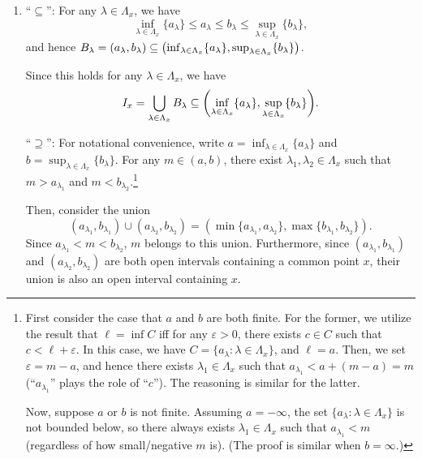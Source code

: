 \begin{enumerate}
\begin{pf}
\begin{enumerate}
\item ``\(\subseteq\)'': For any \(\lambda\in\Lambda_{x}\), we have
\[
\inf_{\lambda\in\Lambda_{x}}\{a_{\lambda}\}
\le a_{\lambda}\le b_{\lambda}
\le\sup_{\lambda\in\Lambda_{x}}\{b_{\lambda}\},
\]
and hence \(B_{\lambda}=(a_{\lambda},b_{\lambda})\subseteq
\qty(\inf_{\lambda\in\Lambda_{x}}\{a_{\lambda}\}
,\sup_{\lambda\in\Lambda_x}\{b_{\lambda}\})\).

Since this holds for any \(\lambda\in\Lambda_{x}\), we have
\[
I_x=\bigcup_{\lambda\in\Lambda_{x}}B_{\lambda}
\subseteq \qty(\inf_{\lambda\in\Lambda_{x}}\{a_{\lambda}\}
,\sup_{\lambda\in\Lambda_x}\{b_{\lambda}\}).
\]

``\(\supseteq\)'': For notational convenience, write \(\displaystyle
a=\inf_{\lambda\in\Lambda_{x}}\{a_{\lambda}\}\) and \(\displaystyle
b=\sup_{\lambda\in\Lambda_{x}}\{b_{\lambda}\}\). For any \(m\in(a,b)\), there
exist \(\lambda_1,\lambda_2\in\Lambda_{x}\) such that \(m>a_{\lambda_1}\) and
\(m<b_{\lambda_2}\).\footnote{First consider the case that \(a\) and \(b\)
are both finite. For the former, we utilize the result that \(\ell=\inf C\) iff
for any \(\varepsilon>0\), there exists \(c\in C\) such that
\(c<\ell+\varepsilon\). In this case, we have
\(C=\{a_{\lambda}:\lambda\in\Lambda_{x}\}\), and \(\ell=a\). Then, we set
\(\varepsilon=m-a\), and hence there exists \(\lambda_{1}\in\Lambda_{x}\) such
that \(a_{\lambda_1}<a+(m-a)=m\) (``\(a_{\lambda_1}\)'' plays the role of
``\(c\)''). The reasoning is similar for the latter.

Now, suppose \(a\) or \(b\) is not finite. Assuming \(a=-\infty\), the set
\(\{a_{\lambda}:\lambda\in\Lambda_x\}\) is not bounded below, so there always
exists \(\lambda_1\in\Lambda_x\) such that \(a_{\lambda_1}<m\) (regardless of
how small/negative \(m\) is). (The proof is similar when \(b=\infty\).)
}

Then, consider the union
\[
(a_{\lambda_1},b_{\lambda_1})\cup(a_{\lambda_2},b_{\lambda_2})
=(\min\{a_{\lambda_1},a_{\lambda_2}\},\max\{b_{\lambda_1},b_{\lambda_2}\}).
\]
Since \(a_{\lambda_1}<m<b_{\lambda_2}\), \(m\) belongs to this union.
Furthermore, since \((a_{\lambda_1},b_{\lambda_1})\) and
\((a_{\lambda_2},b_{\lambda_2})\) are both open intervals containing a common
point \(x\), their union is also an open interval containing \(x\).
\begin{center}
\end{center}


\end{enumerate}
\end{pf}
\end{enumerate}
